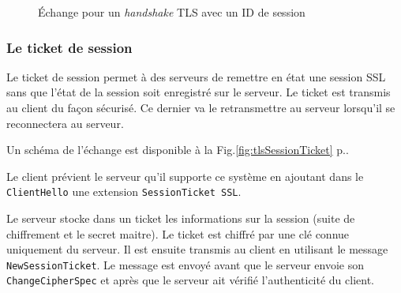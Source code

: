 \begin{figure}[ht]
\centering
{}
\caption{\'Echange pour un \textit{handshake} TLS avec un ID de session}
\label{fig:tlsSessionID}
\end{figure}
\subsubsection{Le ticket de session}
Le ticket de session permet à des serveurs de remettre en état une session SSL sans que l'état de la session soit enregistré sur le serveur.
Le ticket est transmis au client du façon sécurisé. 
Ce dernier va le retransmettre au serveur lorsqu'il se reconnectera au serveur.

Un schéma de l'échange est disponible à la Fig.\ref{fig:tlsSessionTicket} p.\pageref{fig:tlsSessionTicket}.

Le client prévient le serveur qu'il supporte ce système en ajoutant dans le \texttt{ClientHello} une extension \texttt{SessionTicket SSL}.

Le serveur stocke dans un ticket les informations sur la session (suite de chiffrement et le secret maitre).
Le ticket est chiffré par une clé connue uniquement du serveur.
Il est ensuite transmis au client en utilisant le message \texttt{NewSessionTicket}. 
Le message est envoyé avant que le serveur envoie son \texttt{ChangeCipherSpec} et après que le serveur ait vérifié l'authenticité du client.

